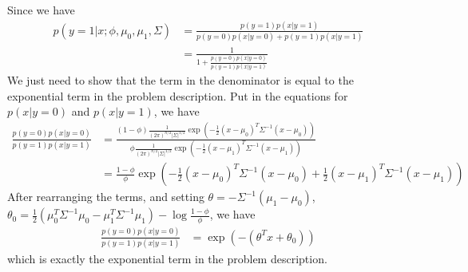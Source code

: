 \begin{answer}
    Since we have
    \begin{align*}
        p(y=1|x;\phi,\mu_0,\mu_1,\Sigma) &= \frac{p(y=1) p(x|y=1)}{p(y=0) p(x|y=0) + p(y=1)p(x|y=1)} \\
        &= \frac{1}{1 + \frac{p(y=0)p(x|y=0)}{p(y=1)p(x|y=1)}} 
    \end{align*}
    We just need to show that the term in the denominator is equal to
    the exponential term in the problem description.
    Put in the equations for $p(x|y=0)$ and $p(x|y=1)$, we have
    \begin{align*}
        \frac{p(y=0)p(x|y=0)}{p(y=1)p(x|y=1)} &= \frac{(1-\phi) \frac{1}{(2\pi)^{n/2}|\Sigma|^{1/2}} \exp\left(-\frac{1}{2}(x-\mu_0)^T\Sigma^{-1}(x-\mu_0)\right)}{\phi \frac{1}{(2\pi)^{n/2}|\Sigma|^{1/2}} \exp\left(-\frac{1}{2}(x-\mu_1)^T\Sigma^{-1}(x-\mu_1)\right)} \\
        &= \frac{1-\phi}{\phi} \exp\left(-\frac{1}{2}(x-\mu_0)^T\Sigma^{-1}(x-\mu_0) + \frac{1}{2}(x-\mu_1)^T\Sigma^{-1}(x-\mu_1)\right)
    \end{align*}
    After rearranging the terms, and setting $\theta = - \Sigma^{-1}(\mu_1 - \mu_0)$, $\theta_0 = \frac{1}{2}(\mu_0^T\Sigma^{-1}\mu_0 - \mu_1^T\Sigma^{-1}\mu_1) - \log\frac{1-\phi}{\phi}$, we have
    \begin{align*}
        \frac{p(y=0)p(x|y=0)}{p(y=1)p(x|y=1)} &= \exp(-(\theta^Tx + \theta_0))
    \end{align*}
    which is exactly the exponential term in the problem description.
\end{answer}
